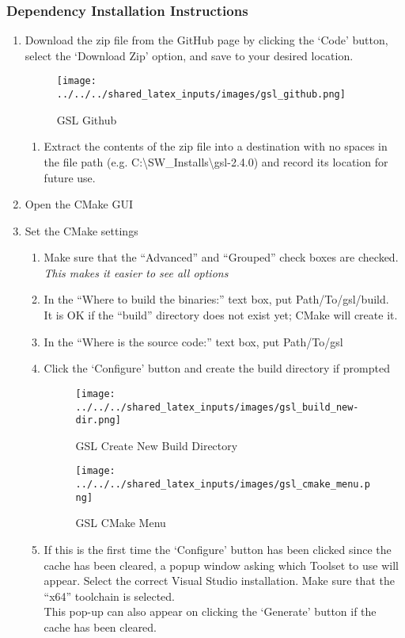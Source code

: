 \subsubsection{Dependency Installation Instructions}
\label{sec:gsl_installation_instructions}
\begin{enumerate}
	\item Download the zip file from the GitHub page by clicking the ‘Code’ button, select the ‘Download Zip’ option, and save to your desired location.
	\begin{figure}[H]
		\centering
		\texttt{[image: ../../../shared\_latex\_inputs/images/gsl\_github.png]}
		\caption{GSL Github}
	\end{figure}
	\begin{enumerate}
		\item Extract the contents of the zip file into a destination with no spaces in the file path (e.g. C:\textbackslash SW\_Installs\textbackslash gsl-2.4.0) and record its location for future use.
	\end{enumerate}
	\item \label{bundle:gsl} Open the CMake \ac{GUI}
	\item Set the CMake settings
	\begin{enumerate}
		\item Make sure that the “Advanced” and “Grouped” check boxes are checked. \\ \emph{This makes it easier to see all options}
		\item In the “Where to build the binaries:” text box, put Path/To/gsl/build. \\ It is OK if the “build” directory does not exist yet; CMake will create it. 
		\item In the “Where is the source code:” text box, put Path/To/gsl
		\item Click the ‘Configure’ button and create the build directory if prompted 
			\begin{figure}[H]
				\centering
				\texttt{[image: ../../../shared\_latex\_inputs/images/gsl\_build\_new-dir.png]}
				\caption{GSL Create New Build Directory}
			\end{figure}
			\begin{figure}[H]
				\centering
				\texttt{[image: ../../../shared\_latex\_inputs/images/gsl\_cmake\_menu.png]}
				\caption{GSL CMake Menu}
			\end{figure}
		\item If this is the first time the ‘Configure’ button has been clicked since the cache has been cleared, a popup window asking which Toolset to use will appear. Select the correct Visual Studio installation. Make sure that the “x64” toolchain is selected. \\ This pop-up can also appear on clicking the ‘Generate’ button if the cache has been cleared.

\end{enumerate}
\end{enumerate}

